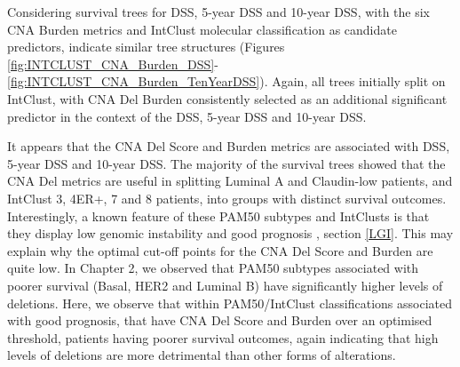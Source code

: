 Considering survival trees for DSS, 5-year DSS and 10-year DSS, with the six CNA Burden metrics and IntClust molecular classification as candidate predictors, indicate similar tree structures (Figures \ref{fig:INTCLUST_CNA_Burden_DSS}-\ref{fig:INTCLUST_CNA_Burden_TenYearDSS}). Again, all trees initially split on IntClust, with CNA Del Burden consistently selected as an additional significant predictor in the context of the DSS, 5-year DSS and 10-year DSS. 

It appears that the CNA Del Score and Burden metrics are associated with DSS, 5-year DSS and 10-year DSS. The majority of the survival trees showed that the CNA Del metrics are useful in splitting Luminal A and Claudin-low patients, and IntClust 3, 4ER+, 7 and 8 patients, into groups with distinct survival outcomes. Interestingly, a known feature of these PAM50 subtypes and IntClusts is that they display low genomic instability and good prognosis \citep{pmid22522925}, section \ref{LGI}. This may explain why the optimal cut-off points for the CNA Del Score and Burden are quite low. In Chapter 2, we observed that PAM50 subtypes associated with poorer survival (Basal, HER2 and Luminal B) have significantly higher levels of deletions. Here, we observe that within PAM50/IntClust classifications associated with good prognosis, that have CNA Del Score and Burden over an optimised threshold, patients having poorer survival outcomes, again indicating that high levels of deletions are more detrimental than other forms of alterations.

